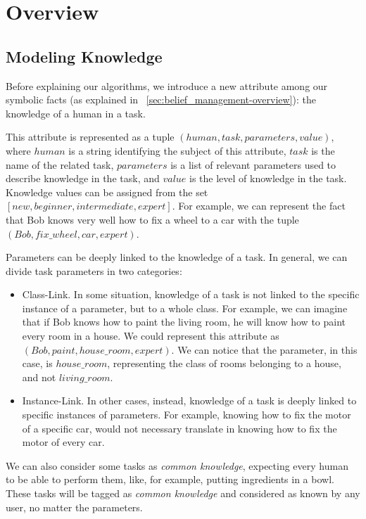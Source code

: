 \section{Overview}
\label{sec:knowledge-overview}
\subsection{Modeling Knowledge}
Before explaining our algorithms, we introduce a new attribute among our symbolic facts (as explained in ~\ref{sec:belief_management-overview}): the knowledge of a human in a task.

This attribute is represented as a tuple $(human, task, parameters, value)$, where $human$ is a string identifying the subject of this attribute, $task$ is the name of the related task, $parameters$ is a list of relevant parameters used to describe knowledge in the task, and $value$ is the level of knowledge in the task. Knowledge values can be assigned from the set $[new, beginner, intermediate, expert]$.  For example, we can represent the fact that Bob knows very well how to fix a wheel to a car with the tuple $(Bob, fix\_wheel, car, expert)$. 

Parameters can be deeply linked to the knowledge of a task. In general, we can divide task parameters in two categories:
\begin{itemize}
\item Class-Link. In some situation, knowledge of a task is not linked to the specific instance of a parameter, but to a whole class. For example, we can imagine that if Bob knows how to paint the living room, he will know how to paint every room in a house. We could represent this attribute as $(Bob, paint, house\_room, expert)$. We can notice that the parameter, in this case, is $house\_room$, representing the class of rooms belonging to a house, and not $living\_room$.
\item Instance-Link. In other cases, instead, knowledge of a task is deeply linked to specific instances of parameters. For example, knowing how to fix the motor of a specific car, would not necessary translate in knowing how to fix the motor of every car.
\end{itemize}

We can also consider some tasks as \textit{common knowledge}, expecting every human to be able to perform them, like, for example, putting ingredients in a bowl. These tasks will be tagged as \textit{common knowledge} and considered as known by any user, no matter the parameters. 

